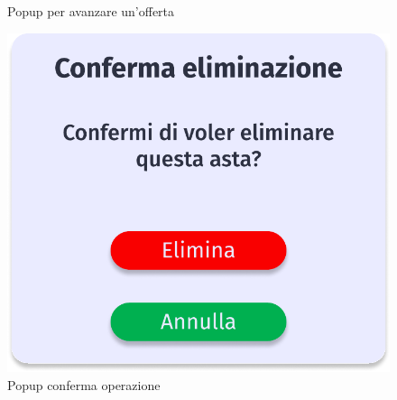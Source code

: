 \begin{figure}[!htb]
\begin{minipage}{0.32\textwidth}
            \caption{Popup per avanzare un'offerta}
        \end{minipage}\hfill
        \begin{minipage}{0.32\textwidth}
            \centering
            \includegraphics[width=.7\linewidth]{Immagini/Frames/Popup/P5.pdf}
            \caption{Popup conferma operazione}
        \end{minipage}\hfill
    \end{figure}

    \clearpage

